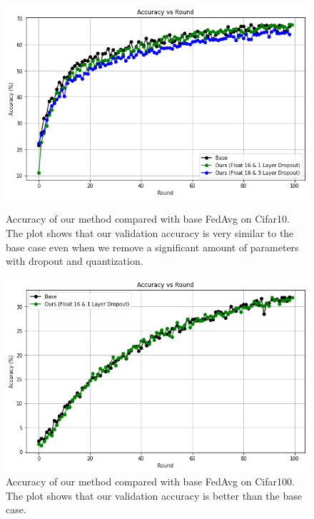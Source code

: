 \documentclass{article}
\begin{document}
\begin{figure}[ht]
  \centering
  \begin{minipage}{.45\textwidth}
    \centering
    \includegraphics[width=\linewidth, height=0.7\linewidth]{img/Acc_Cifar10.png}
    \caption{Accuracy of our method compared with base FedAvg on Cifar10. The plot shows that our validation accuracy is very similar to the base case even when we remove a significant amount of parameters with dropout and quantization.}
    \label{fig:fed_cifar}
  \end{minipage}\hfill %
  \begin{minipage}{.45\textwidth}
    \centering
    \includegraphics[width=\linewidth, height=0.7\linewidth]{img/Acc_Cifar100.png}
    \caption{Accuracy of our method compared with base FedAvg on Cifar100. The plot shows that our validation accuracy is better than the base case.}
    \label{fig:cifar100}
  \end{minipage}
\end{figure}
\end{document}
